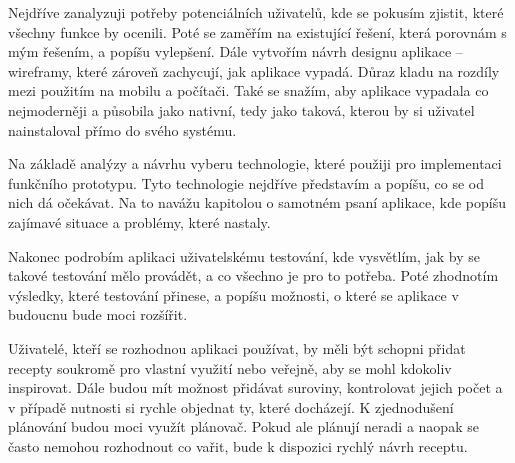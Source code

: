 Nejdříve zanalyzuji potřeby potenciálních uživatelů, kde se pokusím zjistit, které všechny funkce by ocenili. Poté se
zaměřím na existující řešení, která porovnám s mým řešením, a popíšu vylepšení. Dále vytvořím návrh designu aplikace -- wireframy,
které zároveň zachycují, jak aplikace vypadá. Důraz kladu na rozdíly mezi použitím na mobilu a počítači. Také se snažím, aby
aplikace vypadala co nejmoderněji a působila jako nativní, tedy jako taková, kterou by si uživatel nainstaloval přímo do svého systému.

Na základě analýzy a návrhu vyberu technologie, které použiji pro implementaci funkčního prototypu. Tyto technologie nejdříve představím
a popíšu, co se od nich dá očekávat. Na to navážu kapitolou o samotném psaní aplikace, kde popíšu zajímavé situace a problémy, které nastaly.

Nakonec podrobím aplikaci uživatelskému testování, kde vysvětlím, jak by se takové testování mělo provádět, a co všechno je pro to potřeba.
Poté zhodnotím výsledky, které testování přinese, a popíšu možnosti, o které se aplikace v budoucnu bude moci rozšířit.

Uživatelé, kteří se rozhodnou aplikaci používat, by měli být schopni přidat recepty soukromě pro vlastní využití nebo veřejně,
aby se mohl kdokoliv inspirovat. Dále budou mít možnost přidávat suroviny, kontrolovat jejich počet a v případě nutnosti si
rychle objednat ty, které docházejí. K zjednodušení plánování budou moci využít plánovač. Pokud ale plánují neradi a naopak
se často nemohou rozhodnout co vařit, bude k dispozici rychlý návrh receptu.
